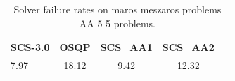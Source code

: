 \begin{table}
\centering
\caption{Solver failure rates on maros meszaros problems AA 5 5 problems.}
\label{t-maros meszaros problems AA 5 5-failure}
\begin{tabular}{lcccc}
\toprule
 SCS-3.0 &  OSQP &  SCS\_AA1 &  SCS\_AA2 \\
\midrule
    7.97 & 18.12 &     9.42 &    12.32 \\
\bottomrule
\end{tabular}
\end{table}
